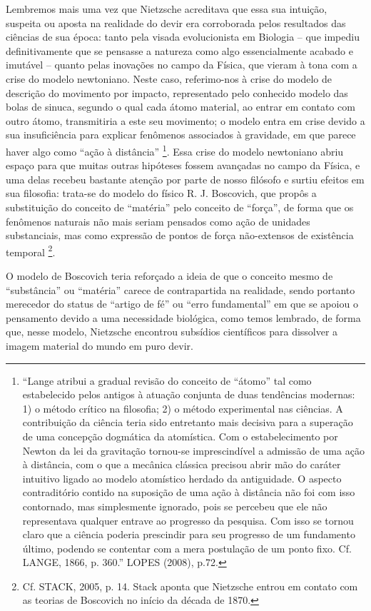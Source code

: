\documentclass[
	12pt,				%
	openright,			%
	oneside,			%
	a4paper,			%
	english,			%
	french,				%
	spanish,			%
	brazil				%
	]{abntex2}
\begin{document}
Lembremos mais uma vez que Nietzsche acreditava que essa sua intuição, suspeita ou aposta na realidade do devir era corroborada pelos resultados das ciências de sua época: tanto pela visada evolucionista em Biologia – que impediu definitivamente que se pensasse a natureza como algo essencialmente acabado e imutável – quanto pelas inovações no campo da Física, que vieram à tona com a crise do modelo newtoniano. Neste caso, referimo-nos à crise do modelo de descrição do movimento por impacto, representado pelo conhecido modelo das bolas de sinuca, segundo o qual cada átomo material, ao entrar em contato com outro átomo, transmitiria a este seu movimento; o modelo entra em crise devido a sua insuficiência para explicar fenômenos associados à gravidade, em que parece haver algo como “ação à distância”
\footnote{“Lange atribui a gradual revisão do conceito de “átomo” tal como estabelecido pelos antigos à atuação conjunta de duas tendências modernas: 1) o método crítico na filosofia; 2) o método experimental nas ciências. A contribuição da ciência teria sido entretanto mais decisiva para a superação de uma concepção dogmática da atomística. Com o estabelecimento por Newton da lei da gravitação tornou-se imprescindível a admissão de uma ação à distância, com o que a mecânica clássica precisou abrir mão do caráter intuitivo ligado ao modelo atomístico herdado da antiguidade. O aspecto contraditório contido na suposição de uma ação à distância não foi com isso contornado, mas simplesmente ignorado, pois se percebeu que ele não representava qualquer entrave ao progresso da pesquisa. Com isso se tornou claro que a ciência poderia prescindir para seu progresso de um fundamento último, podendo se contentar com a mera postulação de um ponto fixo. Cf. LANGE, 1866, p. 360.” LOPES (2008), p.72.}. 
Essa crise do modelo newtoniano abriu espaço para que muitas outras hipóteses fossem avançadas no campo da Física, e uma delas recebeu bastante atenção por parte de nosso filósofo e surtiu efeitos em sua filosofia: trata-se do modelo do físico R. J. Boscovich, que propôs a substituição do conceito de “matéria” pelo conceito de “força”, de forma que os fenômenos naturais não mais seriam pensados como ação de unidades substanciais, mas como expressão de pontos de força não-extensos de existência temporal
\footnote{Cf. STACK, 2005, p. 14. Stack aponta que Nietzsche entrou em contato com as teorias de Boscovich no início da década de 1870.}.

O modelo de Boscovich teria reforçado a ideia de que o conceito mesmo de “substância” ou “matéria” carece de contrapartida na realidade, sendo portanto merecedor do status de “artigo de fé” ou “erro fundamental” em que se apoiou o pensamento devido a uma necessidade biológica, como temos lembrado, de forma que, nesse modelo, Nietzsche encontrou subsídios científicos para dissolver a imagem material do mundo em puro devir.
\end{document}

